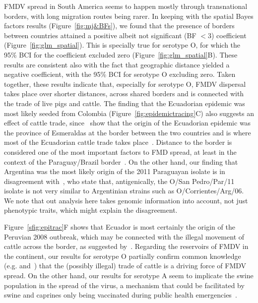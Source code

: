 \documentclass[10pt]{article}
\begin{document}
FMDV spread in South America seems to happen mostly through transnational borders, with long migration routes being rarer.
In keeping with the spatial Bayes factors results (Figure~\ref{fig:mj&BFs}), we found that the presence of borders between countries attained a positive albeit not significant (BF $<3$) coefficient (Figure~\ref{fig:glm_spatial}).
This is specially true for serotype O, for which the 95\% BCI for the coefficient excluded zero (Figure~\ref{fig:glm_spatial}B).
These results are consistent also with the fact that geographic distance yielded a negative coefficient, with the 95\% BCI for serotype O excluding zero.
Taken together, these results indicate that, especially for serotype O, FMDV dispersal takes place over shorter distances, across shared borders and is connected with the trade of live pigs and cattle.
The finding that the Ecuadorian epidemic was most likely seeded from Colombia (Figure~\ref{fig:epidemictracing}C) also suggests an effect of cattle trade, since~\citet{Carvalho2013} show that the origin of the Ecuadorian epidemic was the province of Esmeraldas at the border between the two countries and is where most of the Ecuadorian cattle trade takes place~\citep{Maradei2011}. %
Distance to the border is considered one of the most important factors to FMD spread, at least in the context of the Paraguay/Brazil border~\citep{Amaral2016}.
On the other hand, our finding that Argentina was the most likely origin of the 2011 Paraguayan isolate is in disagreement with~\cite{Maradei2013}, who state that, antigenically, the O/San Pedro/Par/11 isolate is not very similar to Argentinian strains such as O/Corrientes/Arg/06.
We note that out analysis here takes genomic information into account, not just phenotypic traits, which might explain the disagreement.

Figure~\ref{sfig:epitrac}F shows that Ecuador is most certainly the origin of the Peruvian 2008 outbreak, which may be connected with the illegal movement of cattle across the border, as suggested by~\citet{Correa2002}.
Regarding the reservoirs of FMDV in the continent, our results for serotype O partially confirm common knowledge (e.g.\citep{Saraiva2003} and~\citep{Naranjo2013}) that the (possibly illegal) trade of cattle is a driving force of FMDV spread.
On the other hand, our results for serotype A seem to implicate the swine population in the spread of the virus, a mechanism that could be facilitated by swine and caprines only being vaccinated during public health emergencies~\citep{Saraiva2003}.
\end{document}
